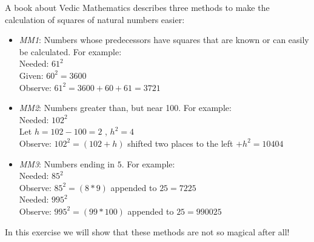 %
\begin{isabellebody}%
\def\isabellecontext{a{\isadigit{3}}}%
\isamarkupfalse%
%
\isamarkuptrue%
%
\begin{isamarkuptext}%
A book about Vedic Mathematics describes three methods to make the calculation of squares of natural numbers easier:

\begin{itemize}
\item {\em MM1}: Numbers whose predecessors have squares that are known or can easily be calculated. For example:
\\ Needed: $61^2$  
\\ Given: $60^2 = 3600$
\\ Observe: $61^2 = 3600 + 60 + 61 = 3721$

\item {\em MM2}: Numbers greater than, but near 100. For example:
\\ Needed: $102^2$
\\ Let $h = 102 - 100 = 2$ , $h^2 = 4$
\\ Observe: $102^2 = (102+h)$ shifted two places to the left $ + h^2 = 10404$
 
\item {\em MM3}: Numbers ending in $5$. For example:
\\ Needed: $85^2$
\\ Observe: $85^2 = (8 * 9)$ appended to $ 25 = 7225$
\\ Needed: $995^2$
\\ Observe: $995^2 = (99 * 100)$ appended to $ 25 = 990025 $
\end{itemize}


In this exercise we will show that these methods are not so magical after all!


\end{isamarkuptext}
\end{isabellebody}
